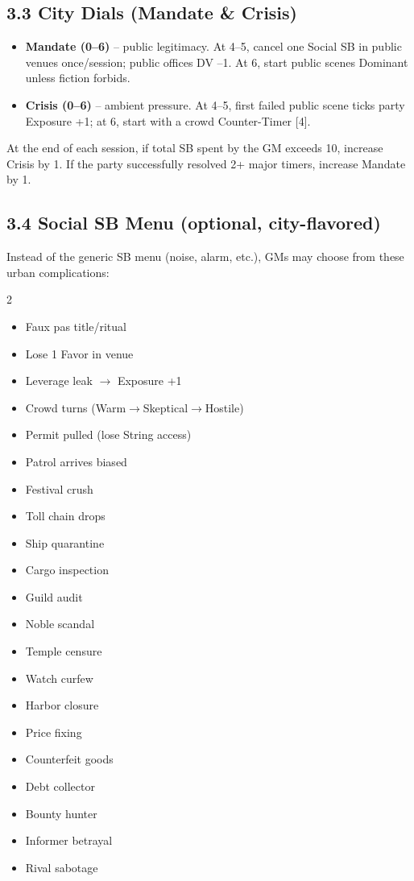 \documentclass[11pt]{article}
\begin{document}
\subsection*{3.3 City Dials (Mandate \& Crisis)}
\begin{itemize}
    \item \textbf{Mandate (0--6)} -- public legitimacy. At 4--5, cancel one Social SB in public venues once/session; public offices DV --1. At 6, start public scenes Dominant unless fiction forbids.
    \item \textbf{Crisis (0--6)} -- ambient pressure. At 4--5, first failed public scene ticks party Exposure +1; at 6, start with a crowd Counter-Timer [4].
\end{itemize}
At the end of each session, if total SB spent by the GM exceeds 10, increase Crisis by 1. If the party successfully resolved 2+ major timers, increase Mandate by 1.

\subsection*{3.4 Social SB Menu (optional, city-flavored)}
Instead of the generic SB menu (noise, alarm, etc.), GMs may choose from these urban complications:

\begin{multicols}{2}
\begin{itemize}
    \item Faux pas title/ritual
    \item Lose 1 Favor in venue
    \item Leverage leak $\rightarrow$ Exposure +1
    \item Crowd turns (Warm$\rightarrow$Skeptical$\rightarrow$Hostile)
    \item Permit pulled (lose String access)
    \item Patrol arrives biased
    \item Festival crush
    \item Toll chain drops
    \item Ship quarantine
    \item Cargo inspection
    \item Guild audit
    \item Noble scandal
    \item Temple censure
    \item Watch curfew
    \item Harbor closure
    \item Price fixing
    \item Counterfeit goods
    \item Debt collector
    \item Bounty hunter
    \item Informer betrayal
    \item Rival sabotage
\end{itemize}
\end{multicols}
\end{document}
